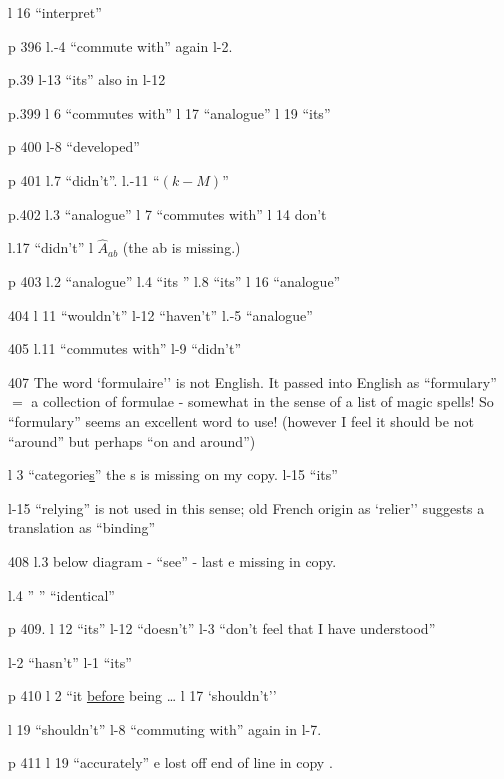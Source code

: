 l 16 ``interpret''

p 396 l.-4 ``commute with'' again l-2.

p.39 l-13 ``its'' also in l-12

p.399 l 6 ``commutes with'' \quad l 17 ``analogue'' \quad l 19 ``its''

p 400 l-8 ``developed''

p 401 l.7 ``didn't''. \quad l.-11 ``$(k-M)$''

p.402 l.3 ``analogue'' \quad l 7 ``commutes with'' \quad l 14 don't

l.17 ``didn't'' \quad l  $\hat{A}_{ab}$ (the ab is missing.)

p 403 l.2 ``analogue'' \quad l.4 ``its '' \quad l.8 ``its'' \quad l 16 ``analogue''

404 l 11 ``wouldn't'' \quad l-12 ``haven't'' \quad l.-5 ``analogue''

405 l.11 ``commutes with'' \quad l-9 ``didn't''

407 The word `formulaire'' is not English. It passed into English as ``formulary'' $=$ a collection of formulae - somewhat in the sense of a list of magic spells! So ``formulary'' seems an excellent word to use! (however I feel it should be not ``around'' but perhaps ``on and around'')

l 3 ``categorie\uline{s}'' the s is missing on my copy. \quad l-15 ``its''

l-15 ``relying'' is not used in this sense;   old French origin as  `relier'' suggests a translation as ``binding''

408 l.3 below diagram - ``see'' - last e missing in copy.

l.4  '' \quad '' \quad ``identical''

p 409. l 12 ``its'' \quad l-12 ``doesn't'' \quad l-3 ``don't feel that I have understood''

l-2 ``hasn't'' \quad l-1 ``its''

p 410  \quad l 2 ``it \uline{before} being \ldots{}  \quad l 17 `shouldn't''

l 19 ``shouldn't'' \quad l-8 ``commuting with'' again in l-7.

p 411 l 19 ``accurately'' \quad e lost off end of line in copy .

